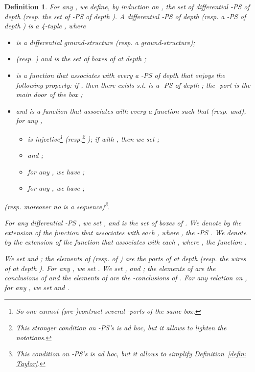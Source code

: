 \documentclass{article}
\theoremstyle{plain}
\newtheorem{definition}{Definition}
\begin{document}
\begin{definition}\label{defin: differential PS}
For any , we define, by induction on , the set of \emph{differential -PS of depth } (resp. the set of \emph{-PS of depth }). 
A \emph{differential -PS of depth } (resp. a \emph{-PS of depth }) is a 4-tuple , where
\begin{itemize}
\item  is a differential ground-structure (resp. a ground-structure);
\item  (resp. ) and is the set of \emph{boxes of  at depth }; 
\item  is a function that associates with every  a -PS     of depth  that enjoys the following property: if , then there exists  s.t.  is a -PS of depth ; the -port  is \emph{the main door of the box };
\item and  is a function that associates with every  a function  such that (resp.  and), for any , 
\begin{itemize}
\item  is injective\footnote{So one cannot (pre-)contract several -ports of the same box.} (resp.\footnote{This stronger condition on -PS's is \emph{ad hoc}, but it allows to lighten the notations.} ); if  with , then we set ;
\item  and ;
\item for any , we have   ;
\item for any , we have ;
\end{itemize}
\end{itemize}
(resp. moreover no  is a sequence)\footnote{This condition on -PS's is \emph{ad hoc}, but it allows to simplify Definition~\ref{defin: Taylor}.}.
\begin{comment}
we require that
\begin{itemize}
\item 
\item and, for any  with , we have .
\end{itemize}
\end{comment}
For any differential -PS , we set ,  and  is the set of \emph{boxes of }. We denote by  the extension of the function  that associates with each , where , the -PS . We denote by  the extension of the function  that associates with each , where , the function .

We set 
 and ; the elements of  (resp. of ) are the \emph{ports of  at depth } (resp. the \emph{wires of  at depth }). 
For any , we set . 
We set ,  and ; the elements of  are the \emph{conclusions of } and the elements of  are the \emph{-conclusions of }. For any relation  on , for any , we set  and .
\end{definition}
\end{document}
